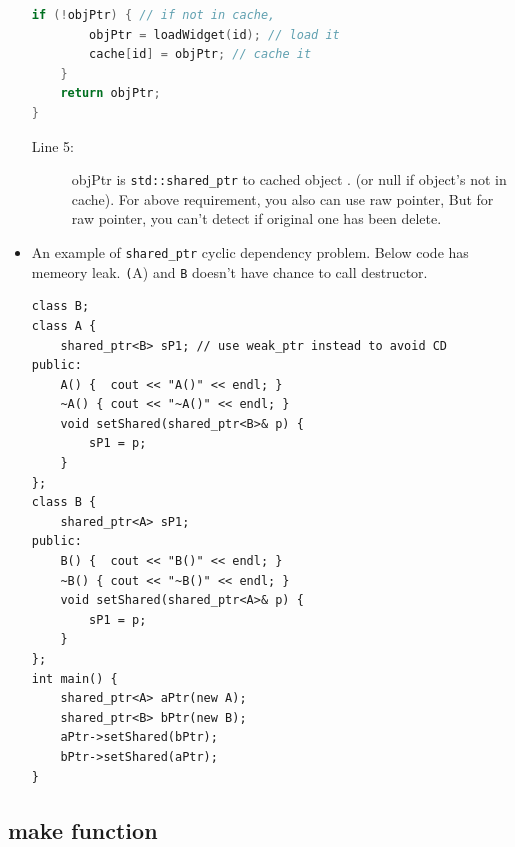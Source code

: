 \documentclass[a4paper,11pt,twoside]{book}
\begin{document}
\begin{itemize}
\begin{lstlisting}[frame=single, language=c++]
	if (!objPtr) { // if not in cache,
		objPtr = loadWidget(id); // load it
		cache[id] = objPtr; // cache it
	}
	return objPtr;
}
\end{lstlisting}
\begin{description}
	\item[Line 5:] objPtr is \texttt{std::shared\_ptr} to cached object . (or null if object's not in cache). For above requirement, you also can use raw pointer, But for raw pointer, you can't detect if original one has been delete. 
\end{description}

    \item An example of \texttt{shared\_ptr} cyclic dependency problem. Below code has memeory leak. \texttt(A) and \texttt{B} doesn't have chance to call destructor.
\begin{lstlisting}[]
class B;
class A {
    shared_ptr<B> sP1; // use weak_ptr instead to avoid CD
public:
    A() {  cout << "A()" << endl; }
    ~A() { cout << "~A()" << endl; }
    void setShared(shared_ptr<B>& p) {
        sP1 = p;
    }
};
class B {
    shared_ptr<A> sP1;
public:
    B() {  cout << "B()" << endl; }
    ~B() { cout << "~B()" << endl; }
    void setShared(shared_ptr<A>& p) {
        sP1 = p;
    }
};
int main() {
    shared_ptr<A> aPtr(new A);
    shared_ptr<B> bPtr(new B);
    aPtr->setShared(bPtr);
    bPtr->setShared(aPtr);
}
\end{lstlisting}

\end{itemize}

\subsection{make function}
\end{document}
